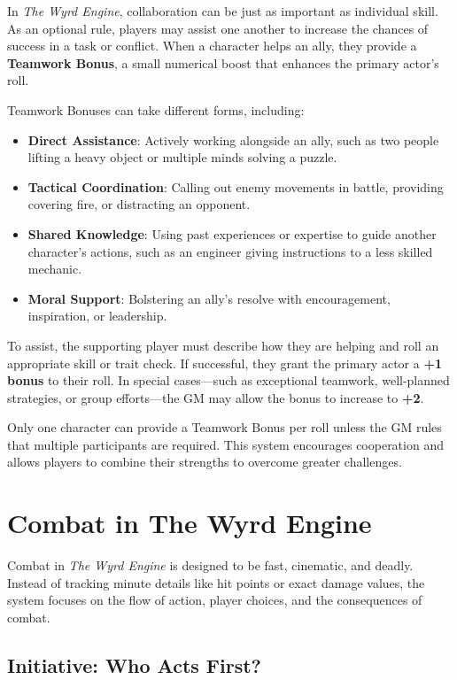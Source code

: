 In \textit{The Wyrd Engine}, collaboration can be just as important as individual skill. As an optional rule, players may assist one another to increase the chances of success in a task or conflict. When a character helps an ally, they provide a \textbf{Teamwork Bonus}, a small numerical boost that enhances the primary actor’s roll.  

Teamwork Bonuses can take different forms, including:  

\begin{itemize}
    \item \textbf{Direct Assistance}: Actively working alongside an ally, such as two people lifting a heavy object or multiple minds solving a puzzle.  
    \item \textbf{Tactical Coordination}: Calling out enemy movements in battle, providing covering fire, or distracting an opponent.  
    \item \textbf{Shared Knowledge}: Using past experiences or expertise to guide another character’s actions, such as an engineer giving instructions to a less skilled mechanic.  
    \item \textbf{Moral Support}: Bolstering an ally’s resolve with encouragement, inspiration, or leadership.  
\end{itemize}

To assist, the supporting player must describe how they are helping and roll an appropriate skill or trait check. If successful, they grant the primary actor a \textbf{+1 bonus} to their roll. In special cases—such as exceptional teamwork, well-planned strategies, or group efforts—the GM may allow the bonus to increase to \textbf{+2}.  

Only one character can provide a Teamwork Bonus per roll unless the GM rules that multiple participants are required. This system encourages cooperation and allows players to combine their strengths to overcome greater challenges.

\section{Combat in The Wyrd Engine}

Combat in \textit{The Wyrd Engine} is designed to be fast, cinematic, and deadly. Instead of tracking minute details like hit points or exact damage values, the system focuses on the flow of action, player choices, and the consequences of combat.

\subsection{Initiative: Who Acts First?}

